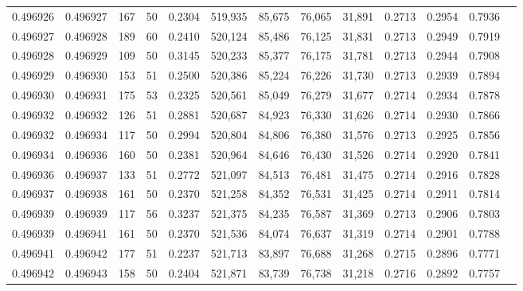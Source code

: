 \begin{tabular}{rrrrrrrrrrrrr}
0.496926 & 0.496927 &   167 &  50 &                                     0.2304 & 519,935 &  85,675 &  76,065 &  31,891 & 0.2713 & 0.2954 & 0.7936 \\
0.496927 & 0.496928 &   189 &  60 &                                     0.2410 & 520,124 &  85,486 &  76,125 &  31,831 & 0.2713 & 0.2949 & 0.7919 \\
0.496928 & 0.496929 &   109 &  50 &                                     0.3145 & 520,233 &  85,377 &  76,175 &  31,781 & 0.2713 & 0.2944 & 0.7908 \\
0.496929 & 0.496930 &   153 &  51 &                                     0.2500 & 520,386 &  85,224 &  76,226 &  31,730 & 0.2713 & 0.2939 & 0.7894 \\
0.496930 & 0.496931 &   175 &  53 &                                     0.2325 & 520,561 &  85,049 &  76,279 &  31,677 & 0.2714 & 0.2934 & 0.7878 \\
0.496932 & 0.496932 &   126 &  51 &                                     0.2881 & 520,687 &  84,923 &  76,330 &  31,626 & 0.2714 & 0.2930 & 0.7866 \\
0.496932 & 0.496934 &   117 &  50 &                                     0.2994 & 520,804 &  84,806 &  76,380 &  31,576 & 0.2713 & 0.2925 & 0.7856 \\
0.496934 & 0.496936 &   160 &  50 &                                     0.2381 & 520,964 &  84,646 &  76,430 &  31,526 & 0.2714 & 0.2920 & 0.7841 \\
0.496936 & 0.496937 &   133 &  51 &                                     0.2772 & 521,097 &  84,513 &  76,481 &  31,475 & 0.2714 & 0.2916 & 0.7828 \\
0.496937 & 0.496938 &   161 &  50 &                                     0.2370 & 521,258 &  84,352 &  76,531 &  31,425 & 0.2714 & 0.2911 & 0.7814 \\
0.496939 & 0.496939 &   117 &  56 &                                     0.3237 & 521,375 &  84,235 &  76,587 &  31,369 & 0.2713 & 0.2906 & 0.7803 \\
0.496939 & 0.496941 &   161 &  50 &                                     0.2370 & 521,536 &  84,074 &  76,637 &  31,319 & 0.2714 & 0.2901 & 0.7788 \\
0.496941 & 0.496942 &   177 &  51 &                                     0.2237 & 521,713 &  83,897 &  76,688 &  31,268 & 0.2715 & 0.2896 & 0.7771 \\
0.496942 & 0.496943 &   158 &  50 &                                     0.2404 & 521,871 &  83,739 &  76,738 &  31,218 & 0.2716 & 0.2892 & 0.7757 \\

\end{tabular}
